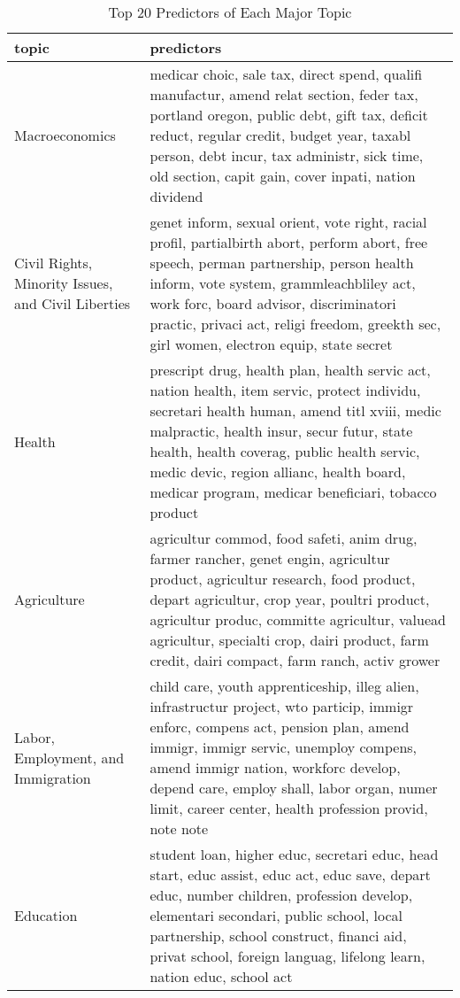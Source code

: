 \begingroup\tiny
\begin{longtable}{p{}p{}}
\caption{Top 20 Predictors of Each Major Topic} \\ 
  \hline
topic & predictors \\ 
  \hline
Macroeconomics & medicar choic, sale tax, direct spend, qualifi manufactur, amend relat section, feder tax, portland oregon, public debt, gift tax, deficit reduct, regular credit, budget year, taxabl person, debt incur, tax administr, sick time, old section, capit gain, cover inpati, nation dividend \\ 
   \hline
Civil Rights, Minority Issues, and Civil Liberties & genet inform, sexual orient, vote right, racial profil, partialbirth abort, perform abort, free speech, perman partnership, person health inform, vote system, grammleachbliley act, work forc, board advisor, discriminatori practic, privaci act, religi freedom, greekth sec, girl women, electron equip, state secret \\ 
   \hline
Health & prescript drug, health plan, health servic act, nation health, item servic, protect individu, secretari health human, amend titl xviii, medic malpractic, health insur, secur futur, state health, health coverag, public health servic, medic devic, region allianc, health board, medicar program, medicar beneficiari, tobacco product \\ 
   \hline
Agriculture & agricultur commod, food safeti, anim drug, farmer rancher, genet engin, agricultur product, agricultur research, food product, depart agricultur, crop year, poultri product, agricultur produc, committe agricultur, valuead agricultur, specialti crop, dairi product, farm credit, dairi compact, farm ranch, activ grower \\ 
   \hline
Labor, Employment, and Immigration & child care, youth apprenticeship, illeg alien, infrastructur project, wto particip, immigr enforc, compens act, pension plan, amend immigr, immigr servic, unemploy compens, amend immigr nation, workforc develop, depend care, employ shall, labor organ, numer limit, career center, health profession provid, note note \\ 
   \hline
Education & student loan, higher educ, secretari educ, head start, educ assist, educ act, educ save, depart educ, number children, profession develop, elementari secondari, public school, local partnership, school construct, financi aid, privat school, foreign languag, lifelong learn, nation educ, school act \\ 

\end{longtable}
